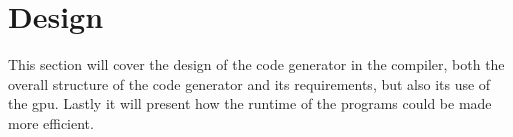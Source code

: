 
\section{Design}
This section will cover the design of the code generator in the compiler, both the overall structure of the code generator and its requirements, but also its use of the \acrshort{gpu}.
Lastly it will present how the runtime of the programs could be made more efficient.





